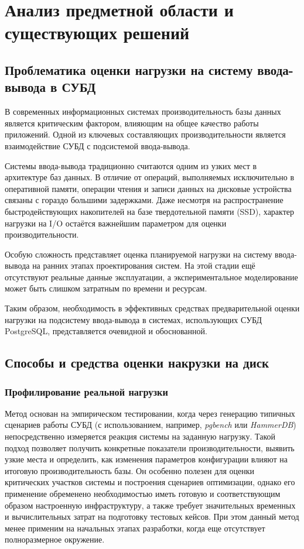 \section{Анализ предметной области и существующих решений}

\subsection{Проблематика оценки нагрузки на систему ввода-вывода в СУБД}

В современных информационных системах производительность базы данных является критическим фактором, влияющим на общее качество работы приложений. Одной из ключевых составляющих производительности является взаимодействие СУБД с подсистемой ввода-вывода.

Системы ввода-вывода традиционно считаются одним из узких мест в архитектуре баз данных. В отличие от операций, выполняемых исключительно в оперативной памяти, операции чтения и записи данных на дисковые устройства связаны с гораздо большими задержками. Даже несмотря на распространение быстродействующих накопителей на базе твердотельной памяти (SSD), характер нагрузки на I/O остаётся важнейшим параметром для оценки производительности. \cite{hellerstein2007architecture}

Особую сложность представляет оценка планируемой нагрузки на систему ввода-вывода на ранних этапах проектирования систем. На этой стадии ещё отсутствуют реальные данные эксплуатации, а экспериментальное моделирование может быть слишком затратным по времени и ресурсам.

Таким образом, необходимость в эффективных средствах предварительной оценки нагрузки на подсистему ввода-вывода в системах, использующих СУБД PostgreSQL, представляется очевидной и обоснованной.


\subsection{Способы и средства оценки накрузки на диск} 


\subsubsection{Профилирование реальной нагрузки}
Метод основан на эмпирическом тестировании, когда через генерацию типичных сценариев работы СУБД (с использованием, например, \textit{pgbench} или \textit{HammerDB}) непосредственно измеряется реакция системы на заданную нагрузку. Такой подход позволяет получить конкретные показатели производительности, выявить узкие места и определить, как изменения параметров конфигурации влияют на итоговую производительность базы. Он особенно полезен для оценки критических участков системы и построения сценариев оптимизации, однако его применение обременено необходимостью иметь готовую и соответствующим образом настроенную инфраструктуру, а также требует значительных временных и вычислительных затрат на подготовку тестовых кейсов. При этом данный метод менее применим на начальных этапах разработки, когда еще отсутствует полноразмерное окружение.

